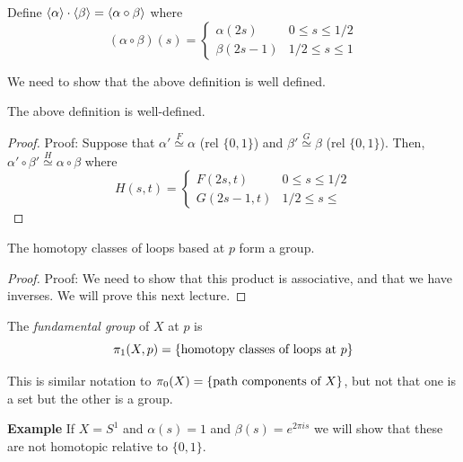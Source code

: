 \begin{definition}
    Define $\brac{\alpha} \cdot \brac{\beta} = \brac{\alpha \circ \beta}$ where
    \[ (\alpha \circ \beta)(s) = \left\{\begin{matrix} \alpha(2s) & 0 \leq s \leq 1/2 \\ \beta(2s - 1) & 1/2 \leq s \leq 1\end{matrix}\right. \]
\end{definition}
We need to show that the above definition is well defined. 

\begin{lemma}
    The above definition is well-defined.
\end{lemma}
\begin{proof}{Proof:}
    Suppose that $\alpha' \overset{F}{\simeq} \alpha$ (rel $\{0, 1\}$) and $\beta' \overset{G}{\simeq} \beta$ (rel $\{0, 1\}$). Then, $\alpha' \circ \beta' \overset{H}{\simeq} \alpha \circ \beta$ where
    \[ H(s, t) = \left\{\begin{matrix} F(2s, t) & 0 \leq s \leq 1/2 \\ G(2s - 1, t) & 1/2 \leq s \leq \end{matrix}\right. \]
\end{proof}

\begin{lemma}
    The homotopy classes of loops based at $p$ form a group. 
\end{lemma}
\begin{proof}{Proof:}
    We need to show that this product is associative, and that we have inverses. We will prove this next lecture.
\end{proof}

\begin{definition}
    The \emph{fundamental group} of $X$ at $p$ is
    \[ \pi_{1}(X, p) = \{\tt{homotopy classes of loops at } p\} \]
\end{definition}
This is similar notation to $\pi_{0}(X) = \{\tt{path components of } X\}$, but not that one is a set but the other is a group.\\

\begin{example}{\textbf{Example}}
    If $X = S^1$ and $\alpha(s) = 1$ and $\beta(s) = e^{2\pi i s}$ we will show that these are not homotopic relative to $\{0, 1\}$. 
\end{example}